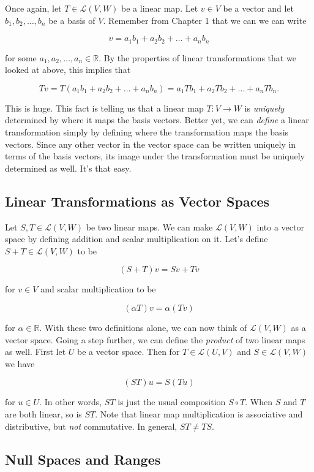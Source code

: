 \documentclass[12pt]{article}
\begin{document}
Once again, let $T \in \mathcal{L}(V, W)$ be a linear map. Let $v \in V$ be a vector and let $b_1, b_2, \ldots, b_n$ be a basis of $V$.  Remember from Chapter 1 that we can we can write

$$v = a_1 b_1 + a_2 b_2 + \ldots + a_n b_n$$

for some $a_1, a_2, \ldots, a_n \in \mathbb{R}$. By the properties of linear transformations that we looked at above, this implies that

$$Tv = T(a_1 b_1 + a_2 b_2 + \ldots + a_n b_n) = a_1 T b_1 + a_2 T b_2 + \ldots + a_n T b_n.$$

This is huge. This fact is telling us that a linear map $T : V \rightarrow W$ is \textit{uniquely} determined by where it maps the basis vectors. Better yet, we can \textit{define} a linear transformation simply by defining where the transformation maps the basis vectors. Since any other vector in the vector space can be written uniquely in terms of the basis vectors, its image under the transformation must be uniquely determined as well. It's that easy. 

\subsection*{Linear Transformations as Vector Spaces}

Let $S, T \in \mathcal{L} (V, W)$ be two linear maps. We can make $\mathcal{L}(V, W)$ into a vector space by defining addition and scalar multiplication on it. Let's define $S + T \in \mathcal{L}(V, W)$ to be 

$$(S + T)v = Sv + Tv$$

for $v \in V$ and scalar multiplication to be

$$(\alpha T)v = \alpha (Tv)$$

for $\alpha \in \mathbb{R}$. With these two definitions alone, we can now think of $\mathcal{L} (V, W)$ as a vector space. Going a step further, we can define the \textit{product} of two linear maps as well. First let $U$ be a vector space. Then for $T \in \mathcal{L} (U, V)$ and $S \in \mathcal{L} (V, W)$ we have

$$(ST)u = S(Tu)$$

for $u \in U$. In other words, $ST$ is just the usual composition $S \circ T$. When $S$ and $T$ are both linear, so is $ST$. Note that linear map multiplication is associative and distributive, but \textit{not} commutative. In general, $ST \neq TS$.

\subsection*{Null Spaces and Ranges}
\end{document}
